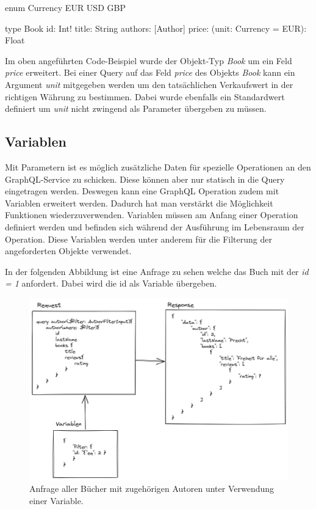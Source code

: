 \begin{JsCode}
enum Currency {
    EUR
    USD
    GBP
}

type Book {
    id: Int!
    title: String
    authors: [Author]
    price: (unit: Currency = EUR): Float
}
\end{JsCode}

Im oben angeführten Code-Beispiel wurde der Objekt-Typ \textit{Book} um ein Feld \textit{price} erweitert.
Bei einer Query auf das Feld \textit{price} des Objekts \textit{Book} kann ein Argument \textit{unit} mitgegeben werden um den tatsächlichen Verkaufswert in der richtigen Währung zu bestimmen.
Dabei wurde ebenfalls ein Standardwert definiert um \textit{unit} nicht zwingend als Parameter übergeben zu müssen.
\cite[S.62]{kress2020graphql}


\subsection{Variablen}
Mit Parametern ist es möglich zusätzliche Daten für spezielle Operationen an den GraphQL-Service zu schicken.
Diese können aber nur statisch in die Query eingetragen werden.
Deswegen kann eine GraphQL Operation zudem mit Variablen erweitert werden.
Dadurch hat man verstärkt die Möglichkeit Funktionen wiederzuverwenden.
Variablen müssen am Anfang einer Operation definiert werden und befinden sich während der Ausführung im Lebensraum der Operation.
Diese Variablen werden unter anderem für die Filterung der angeforderten Objekte verwendet.
\cite[Abs. 5.8]{graphqlOnline}
\newline

In der folgenden Abbildung ist eine Anfrage zu sehen welche das Buch mit der \textit{id = 1} anfordert. Dabei wird die id als Variable übergeben.

\begin{figure}[H]
    \includegraphics[width=\textwidth]{pics/book_request_with_parameter.png}
    \caption{Anfrage aller Bücher mit zugehörigen Autoren unter Verwendung einer Variable.}
\end{figure}


